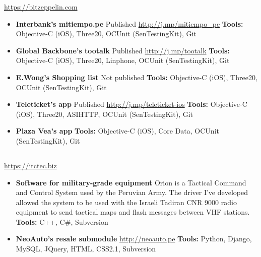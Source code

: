 \documentclass[11pt,a4paper,english]{moderncv}
\begin{document}
{
\url{https://bitzeppelin.com}
\newline{}
\begin{itemize}
    \item \textbf{Interbank's mitiempo.pe}
        \newline{}
        Published \url{http://j.mp/mitiempo_pe}
        \newline{}
        \textbf{Tools:} Objective-C (iOS), Three20, OCUnit (SenTestingKit), Git
    \item \textbf{Global Backbone's tootalk}
        \newline{}
        Published \url{http://j.mp/tootalk}
        \newline{}
        \textbf{Tools:} Objective-C (iOS), Three20, Linphone, OCUnit (SenTestingKit), Git
    \item \textbf{E.Wong's Shopping list}
        \newline{}
        Not published
        \newline{}
        \textbf{Tools:} Objective-C (iOS), Three20, OCUnit (SenTestingKit), Git
    \item \textbf{Teleticket's app}
        \newline{}
        Published \url{http://j.mp/teleticket-ios}
        \newline{}
        \textbf{Tools:} Objective-C (iOS), Three20, ASIHTTP, OCUnit (SenTestingKit), Git
    \item \textbf{Plaza Vea's app}
        \newline{}
        \textbf{Tools:} Objective-C (iOS), Core Data, OCUnit (SenTestingKit), Git
\end{itemize}
}

\subsection{}

{
\url{https://itctec.biz}
\newline{}
\begin{itemize}
    \item \textbf{Software for military-grade equipment}
        \newline{}
        Orion is a Tactical Command and Control System used by the Peruvian Army. The driver I've developed allowed the system to be used with the Israeli Tadiran CNR 9000 radio equipment to send tactical maps and flash messages between VHF stations.
        \newline{}
        \textbf{Tools:} C++, C\#, Subversion
    \item \textbf{NeoAuto's resale submodule}
        \newline{}
        \url{http://neoauto.pe}
        \newline{}
        \textbf{Tools:} Python, Django, MySQL, JQuery, HTML, CSS2.1, Subversion
\end{itemize}
}
\end{document}
